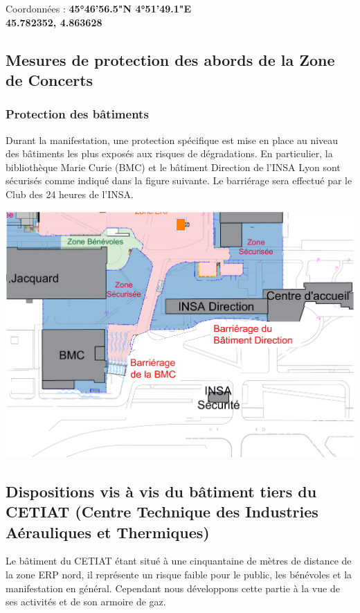 \documentclass[hidelinks, paper=a4, fontsize=13pt]{report}
\begin{document}
\begin{center}
	Coordonnées : \textbf{45°46'56.5"N 4°51'49.1"E}\\
	\textbf{45.782352, 4.863628}
\end{center}
\newpage

\subsection{Mesures de protection des abords de la Zone de Concerts}
\subsubsection{Protection des bâtiments} 
Durant la manifestation, une protection spécifique est mise en place au niveau des bâtiments les plus exposés aux risques de dégradations. En particulier, la bibliothèque Marie Curie (BMC) et le bâtiment Direction de l'INSA Lyon sont sécurisés comme indiqué dans la figure suivante. Le barriérage sera effectué par le Club des 24 heures de l'INSA.

\begin{center}
	\includegraphics[width=.8\textwidth,keepaspectratio]{Exports/Plan_24h_45eme-Protection_Bat}
\end{center}

\subsection{Dispositions vis à vis du bâtiment tiers du CETIAT (Centre Technique des Industries Aérauliques et Thermiques)}

Le bâtiment du CETIAT étant situé à une cinquantaine de mètres de distance de la zone ERP nord, il représente un risque faible pour le public, les bénévoles et la manifestation en général. Cependant nous développons cette partie à la vue de ses activités et de son armoire de gaz. 
\end{document}
